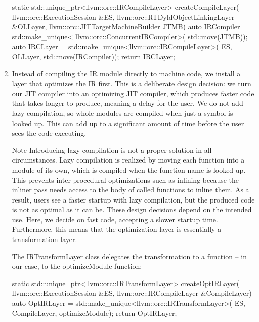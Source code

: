 \begin{enumerate}
\begin{cpp}
    static std::unique_ptr<llvm::orc::IRCompileLayer>
    createCompileLayer(
            llvm::orc::ExecutionSession &ES,
            llvm::orc::RTDyldObjectLinkingLayer &OLLayer,
            llvm::orc::JITTargetMachineBuilder JTMB) {
        auto IRCompiler = std::make_unique<
            llvm::orc::ConcurrentIRCompiler>(
            std::move(JTMB));
        auto IRCLayer =
            std::make_unique<llvm::orc::IRCompileLayer>(
                ES, OLLayer, std::move(IRCompiler));
        return IRCLayer;
    }
\end{cpp}

\item
Instead of compiling the IR module directly to machine code, we install a layer that optimizes the IR first. This is a deliberate design decision: we turn our JIT compiler into an optimizing JIT compiler, which produces faster code that takes longer to produce, meaning a delay for the user. We do not add lazy compilation, so whole modules are compiled when just a symbol is looked up. This can add up to a significant amount of time before the user sees the code executing.

\begin{myNotic}{Note}
Introducing lazy compilation is not a proper solution in all circumstances. Lazy compilation is realized by moving each function into a module of its own, which is compiled when the function name is looked up. This prevents inter-procedural optimizations such as inlining because the inliner pass needs access to the body of called functions to inline them. As a result, users see a faster startup with lazy compilation, but the produced code is not as optimal as it can be. These design decisions depend on the intended use. Here, we decide on fast code, accepting a slower startup time. Furthermore, this means that the optimization layer is essentially a transformation layer.
\end{myNotic}

The IRTransformLayer class delegates the transformation to a function – in our case, to the optimizeModule function:

\begin{cpp}
    static std::unique_ptr<llvm::orc::IRTransformLayer>
    createOptIRLayer(
            llvm::orc::ExecutionSession &ES,
            llvm::orc::IRCompileLayer &CompileLayer) {
        auto OptIRLayer =
        std::make_unique<llvm::orc::IRTransformLayer>(
            ES, CompileLayer,
            optimizeModule);
        return OptIRLayer;
    }
\end{cpp}


\end{enumerate}
